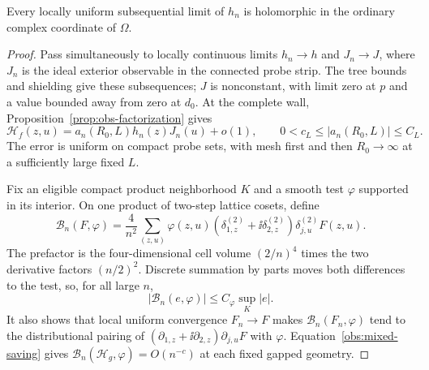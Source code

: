 \begin{theorem}
\label{thm:holomorphic}
Every locally uniform subsequential limit of $h_n$ is holomorphic
in the ordinary complex coordinate of $\Omega$.
\end{theorem}

\begin{proof}
Pass simultaneously to locally continuous limits $h_n\to h$ and
$J_n\to J$, where $J_n$ is the ideal exterior observable in the
connected probe strip.  The tree bounds and shielding give these
subsequences; $J$ is nonconstant, with limit zero at $p$ and a
value bounded away from zero at $d_0$.  At the complete wall,
Proposition~\ref{prop:obs-factorization} gives
\begin{equation}
 \mathcal H_f(z,u)=a_n(R_0,L)h_n(z)J_n(u)+o(1),
 \qquad 0<c_L\le |a_n(R_0,L)|\le C_L.
 \label{obs:hol-factorization}
\end{equation}
The error is uniform on compact probe sets, with mesh first and
then $R_0\to\infty$ at a sufficiently large fixed $L$.

Fix an eligible compact product neighborhood $K$ and a smooth test
$\varphi$ supported in its interior.  On one product of two-step
lattice cosets, define
\begin{equation}
 \mathcal B_n(F,\varphi)=\frac4{n^2}
 \sum_{(z,u)}
 \varphi(z,u)(\delta_{1,z}^{(2)}+\ii\delta_{2,z}^{(2)})
                   \delta_{j,u}^{(2)}F(z,u).
 \label{obs:tested-mixed}
\end{equation}
The prefactor is the four-dimensional cell volume $(2/n)^4$
times the two derivative factors $(n/2)^2$.  Discrete summation
by parts moves both differences to the test, so, for all large $n$,
\begin{equation}
 |\mathcal B_n(e,\varphi)|\le C_\varphi\sup_K|e|.
 \label{obs:tested-value-error}
\end{equation}
It also shows that local uniform convergence $F_n\to F$ makes
$\mathcal B_n(F_n,\varphi)$ tend to the distributional pairing of
$(\partial_{1,z}+\ii\partial_{2,z})\partial_{j,u}F$ with
$\varphi$.  Equation~\eqref{obs:mixed-saving} gives
$\mathcal B_n(\mathcal H_g,\varphi)=O(n^{-c})$ at each fixed gapped
geometry.


\end{proof}

